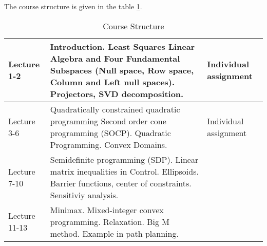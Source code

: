 
The course structure is given in the table \ref{t:course_structure}.

\begin{table}[b]
	\caption{Course Structure}
	\label{t:course_structure}
\begin{tabular}{p{25mm}|p{100mm}|p{30mm}}
  \hline
Lecture 1-2	& 
Introduction. \newline
Least Squares \newline
Linear Algebra and Four Fundamental Subspaces
(Null space, Row space, Column and Left null spaces). \newline
Projectors, SVD decomposition. &	
Individual \newline assignment 
\\   \hline
%
Lecture 3-6 &
Quadratically constrained quadratic programming \newline
Second order cone programming (SOCP). \newline
Quadratic Programming. \newline
Convex Domains.
& 
Individual \newline assignment 
\\   \hline
%
Lecture 7-10	& 
Semidefinite programming (SDP). \newline
Linear matrix inequalities in Control. \newline
Ellipsoids. \newline
Barrier functions, center of constraints. \newline
Sensitiviy analysis. & 
\\  \hline
%
Lecture 11-13	& 
Minimax. \newline
Mixed-integer convex programming. Relaxation. Big M method. Example in path planning. & 
\\  \hline
\end{tabular}
\end{table}